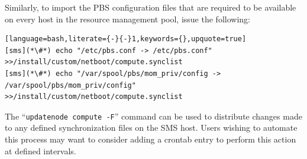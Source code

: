\noindent Similarly, to import the PBS configuration files that are required
to be available on every host in the resource management pool, issue the
following:

\begin{lstlisting}[language=bash,literate={-}{-}1,keywords={},upquote=true]
[sms](*\#*) echo "/etc/pbs.conf -> /etc/pbs.conf" >>/install/custom/netboot/compute.synclist
[sms](*\#*) echo "/var/spool/pbs/mom_priv/config -> /var/spool/pbs/mom_priv/config" >>/install/custom/netboot/compute.synclist
\end{lstlisting}

\begin{center}
\begin{tcolorbox}[]
\small
The ``\texttt{updatenode compute -F}'' command can be used to distribute changes made to any
defined synchronization files on the SMS host. Users wishing to automate this process may
want to consider adding a crontab entry to perform this action at defined intervals.
\end{tcolorbox}
\end{center}
